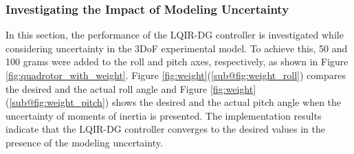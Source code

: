 \documentclass[3p,times]{elsarticle}
\begin{document}
\subsubsection{Investigating the Impact of Modeling Uncertainty}\label{sec:model-uncertainty}
\noindent In this section, the performance of the LQIR-DG controller is investigated while considering uncertainty in the 3DoF experimental model. To achieve this, 50 and 100 grams were added to the roll and pitch axes, respectively, as shown in Figure \ref{fig:quadrotor_with_weight}.
Figure \ref{fig:weight}(\ref{sub@fig:weight_roll}) compares the desired and the actual roll angle and Figure \ref{fig:weight}(\ref{sub@fig:weight_pitch}) shows the desired and the actual pitch angle when the uncertainty of moments of inertia is presented. The implementation results indicate that the LQIR-DG controller converges to the desired values in the presence of the modeling uncertainty.
\end{document}
